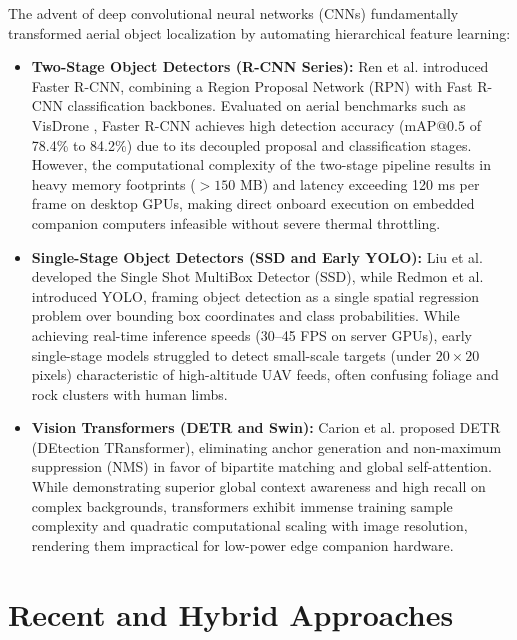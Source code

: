 The advent of deep convolutional neural networks (CNNs) fundamentally transformed aerial object localization by automating hierarchical feature learning:
\begin{itemize}
    \item \textbf{Two-Stage Object Detectors (R-CNN Series):} Ren et al. \cite{8} introduced Faster R-CNN, combining a Region Proposal Network (RPN) with Fast R-CNN classification backbones. Evaluated on aerial benchmarks such as VisDrone \cite{16}, Faster R-CNN achieves high detection accuracy ($\text{mAP@0.5}$ of 78.4\% to 84.2\%) due to its decoupled proposal and classification stages. However, the computational complexity of the two-stage pipeline results in heavy memory footprints ($>150$ MB) and latency exceeding 120 ms per frame on desktop GPUs, making direct onboard execution on embedded companion computers infeasible without severe thermal throttling.
    \item \textbf{Single-Stage Object Detectors (SSD and Early YOLO):} Liu et al. \cite{9} developed the Single Shot MultiBox Detector (SSD), while Redmon et al. \cite{10} introduced YOLO, framing object detection as a single spatial regression problem over bounding box coordinates and class probabilities. While achieving real-time inference speeds (30--45 FPS on server GPUs), early single-stage models struggled to detect small-scale targets (under $20 \times 20$ pixels) characteristic of high-altitude UAV feeds, often confusing foliage and rock clusters with human limbs.
    \item \textbf{Vision Transformers (DETR and Swin):} Carion et al. \cite{11} proposed DETR (DEtection TRansformer), eliminating anchor generation and non-maximum suppression (NMS) in favor of bipartite matching and global self-attention. While demonstrating superior global context awareness and high recall on complex backgrounds, transformers exhibit immense training sample complexity and quadratic computational scaling with image resolution, rendering them impractical for low-power edge companion hardware.
\end{itemize}

\section{Recent and Hybrid Approaches}

